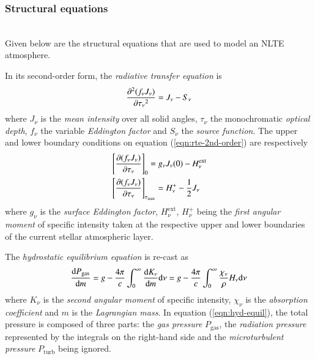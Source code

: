     	\subsubsection{Structural equations}
    	\quad\\	
	    Given below are the structural equations that are used to model an NLTE atmosphere.
	   
		In its second-order form, the \textit{radiative transfer equation} is
		\begin{align}
			\dfrac{\partial^{2}{(f_\nu J_\nu)}}{\partial {\tau_\nu}^{2}}=J_\nu-S_\nu \label{eqn:rte-2nd-order}
		\end{align}
		where $J_\nu$ is the \textit{mean intensity} over all solid angles, $\tau_\nu$ the monochromatic \textit{optical depth}, $f_\nu$ the variable \textit{Eddington factor} and $S_\nu$ the \textit{source function}. The upper and lower boundary conditions on equation (\ref{eqn:rte-2nd-order}) are respectively
		\begin{align}
			&\left[ \dfrac{\partial {(f_\nu J_\nu)}}{\partial {\tau_\nu}} \right]_0=g_\nu J_\nu(0)-H_\nu^\text{ext} \label{eqn:rte-upper-bc} \\
			&\left[ \dfrac{\partial {(f_\nu J_\nu)}}{\partial {\tau_\nu}} \right]_{\tau_\text{max}}=H_\nu^+-\dfrac{1}{2}J_\nu \label{eqn:rte-lower-bc}
		\end{align}
		where $g_\nu$ is the \textit{surface Eddington factor}, $H_\nu^\text{ext}$, $H_\nu^+$ being the \textit{first angular moment} of specific intensity taken at the respective upper and lower boundaries of the current stellar atmospheric layer.
		
		The \textit{hydrostatic equilibrium equation} is re-cast as
		\begin{align}
			\dfrac{\mathrm{d} {P_\text{gas}}}{\mathrm{d} {m}}=g-\dfrac{4\pi}{c}\int_{0}^{\infty}{\dfrac{\mathrm{d} {K_\nu}}{\mathrm{d} {m}}\mathrm{d} {\nu}}=g-\dfrac{4\pi}{c}\int_{0}^{\infty}{\dfrac{\chi_\nu}{\rho}H_\nu\mathrm{d} {\nu}} \label{eqn:hyd-equil}
		\end{align}
		where $K_\nu$ is the \textit{second angular moment} of specific intensity, $\chi_\nu$ is the \textit{absorption coefficient} and $m$ is the \textit{Lagrangian mass}. In equation (\ref{eqn:hyd-equil}), the total pressure is composed of three parts: the \textit{gas pressure} $P_\text{gas}$, the \textit{radiation pressure} represented by the integrals on the right-hand side and the \textit{microturbulent pressure} $P_\text{turb}$ being ignored.
		
